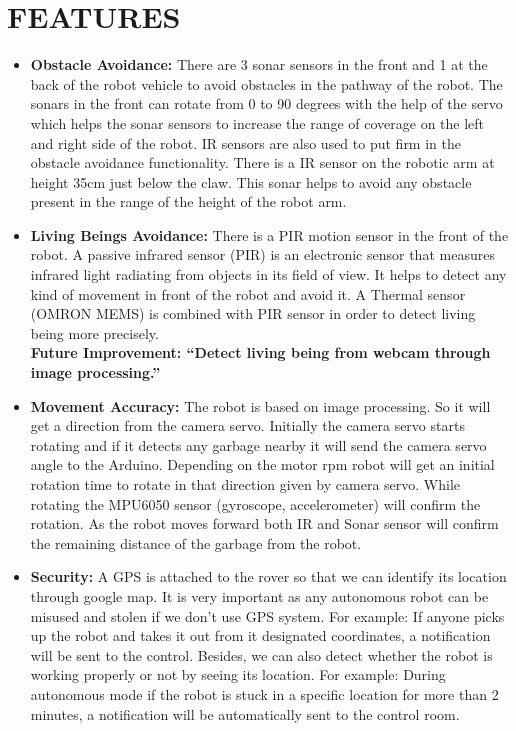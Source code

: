 \documentclass[conference]{IEEEtran}
\begin{document}
	\section{FEATURES}
	\begin{itemize}
		
		\item \textbf{Obstacle Avoidance:} There are 3 sonar sensors in the front and 1 at the back of the robot vehicle to avoid obstacles in the pathway of the robot. The sonars in the front can rotate from 0 to 90 degrees with the help of the servo which helps the sonar sensors to increase the range of coverage on the left and right side of the robot. IR sensors are also used to put firm in the obstacle avoidance functionality. There is a IR sensor on the robotic arm at height 35cm just below the claw. This sonar helps to avoid any obstacle present in the range of the height of the robot arm.
		
		
		\item \textbf{Living Beings Avoidance: } There is a PIR motion sensor in the front of the robot. A passive infrared sensor (PIR) is an electronic sensor that measures infrared light radiating from objects in its field of view. It helps to detect any kind of movement in front of the robot and avoid it. A Thermal sensor (OMRON MEMS) is combined with PIR sensor in order to detect living being more precisely.
		\\
		\textbf{Future Improvement: “Detect living being from webcam through image processing.”}
		
		
		\item \textbf{Movement Accuracy:} The robot is based on image processing. So it will get a direction from the camera servo. Initially the camera servo starts rotating and if it detects any garbage nearby it will send the camera servo angle to the Arduino. Depending on the motor rpm robot will get an initial rotation time to rotate in that direction given by camera servo. While rotating the MPU6050 sensor (gyroscope, accelerometer) will confirm the rotation. As the robot moves forward both IR and Sonar sensor will confirm the remaining distance of the garbage from the robot. 
		
		
		\item \textbf{Security:} A GPS is attached to the rover so that we can identify its location through google map. It is very important as any autonomous robot can be misused and stolen if we don’t use GPS system. For example: If anyone picks up the robot and takes it out from it designated coordinates, a notification will be sent to the control. Besides, we can also detect whether the robot is working properly or not by seeing its location. For example: During autonomous mode if the robot is stuck in a specific location for more than 2 minutes, a notification will be automatically sent to the control room.
		

\end{itemize}
\end{document}
